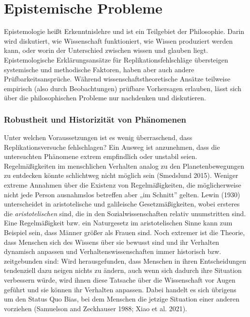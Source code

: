\documentclass[
  letterpaper,
  DIV=11,
  numbers=noendperiod]{scrreprt}
\begin{document}
\chapter{Epistemische Probleme}\label{epistemische-probleme}

Epistemologie heißt Erkenntnislehre und ist ein Teilgebiet der
Philosophie. Darin wird diskutiert, wie Wissenschaft funktioniert, wie
Wissen produziert werden kann, oder worin der Unterschied zwischen
wissen und glauben liegt. Epistemologische Erklärungsansätze für
Replikationsfehlschläge übersteigen systemische und methodische
Faktoren, haben aber auch andere Prüfbarkeitsansprüche. Während
wissenschaftstheoretische Ansätze teilweise empirisch (also durch
Beobachtungen) prüfbare Vorhersagen erlauben, lässt sich über die
philosophischen Probleme nur nachdenken und diskutieren.

\subsection{Robustheit und Historizität von
Phänomenen}\label{robustheit-und-historizituxe4t-von-phuxe4nomenen}

Unter welchen Voraussetzungen ist es wenig überraschend, dass
Replikationsversuche fehlschlagen? Ein Ausweg ist anzunehmen, dass die
untersuchten Phänomene extrem empfindlich oder unstabil seien.
Regelmäßigkeiten im menschlichen Verhalten analog zu den
Planetenbewegungen zu entdecken könnte schlichtweg nicht möglich sein
(Smedslund 2015). Weniger extreme Annahmen über die Existenz von
Regelmäßigkeiten, die möglicherweise nicht jede Person ausnahmslos
betreffen aber „im Schnitt'' gelten. Lewin (1930) unterscheidet in
aristotelische und galileische Gesetzmäßigkeiten, wobei ersteres die
\emph{aristotelischen} sind, die in den Sozialwissenschaften relativ
unumstritten sind. Eine Regelmäßigkeit bzw. ein Naturgesetz im
aristotelischen Sinne kann zum Beispiel sein, dass Männer größer als
Frauen sind. Noch extremer ist die Theorie, dass Menschen sich des
Wissens über sie bewusst sind und ihr Verhalten dynamisch anpassen und
Verhaltenswissenschaften immer historisch bzw. zeitgebunden sind: Wird
herausgefunden, dass Menschen in ihren Entscheidungen tendenziell dazu
neigen nichts zu ändern, auch wenn sich dadurch ihre Situation
verbessern würde, wird ihnen diese Tatsache über die Wissenschaft vor
Augen geführt und sie können ihr Verhalten anpassen. Dabei handelt es
sich übrigens um den Status Quo Bias, bei dem Menschen die jetzige
Situation einer anderen vorziehen (Samuelson and Zeckhauser 1988; Xiao
et al. 2021).
\end{document}
